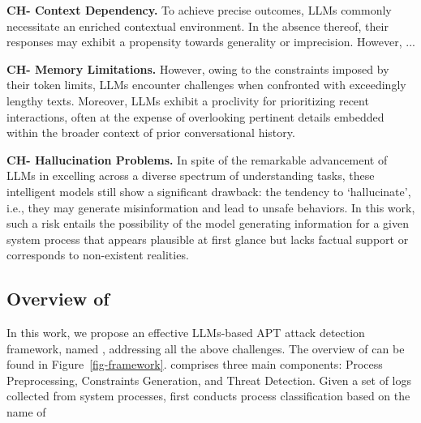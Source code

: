 \noindent
{\bf CH- Context Dependency.} %
To achieve precise outcomes, LLMs commonly necessitate an enriched contextual environment. In the absence thereof, their responses may exhibit a propensity towards generality or imprecision. However, ... 

\noindent
{\bf CH- Memory Limitations.} %
 However, owing to the constraints imposed by their token limits, LLMs encounter challenges when confronted with exceedingly lengthy texts. Moreover, LLMs exhibit a proclivity for prioritizing recent interactions, often at the expense of overlooking pertinent details embedded within the broader context of prior conversational history.

\noindent
{\bf CH- Hallucination Problems.} %
In spite of the remarkable advancement of LLMs in excelling across a diverse spectrum of understanding tasks, these intelligent models still show a significant drawback: the tendency to `hallucinate', i.e., they may generate misinformation and lead to unsafe behaviors.
In this work, such a risk entails the possibility of the model generating information for a given system process that appears plausible at first glance but lacks factual support or corresponds to non-existent realities.


\subsection{Overview of \tool}
In this work, we propose an effective LLMs-based APT attack detection framework, named \tool, addressing all the above challenges. The overview of \tool can be found in Figure~\ref{fig-framework}. \tool comprises three main components: Process Preprocessing, Constraints Generation, and Threat Detection.
Given a set of logs collected from system processes, \tool first conducts process classification based on the name of 

